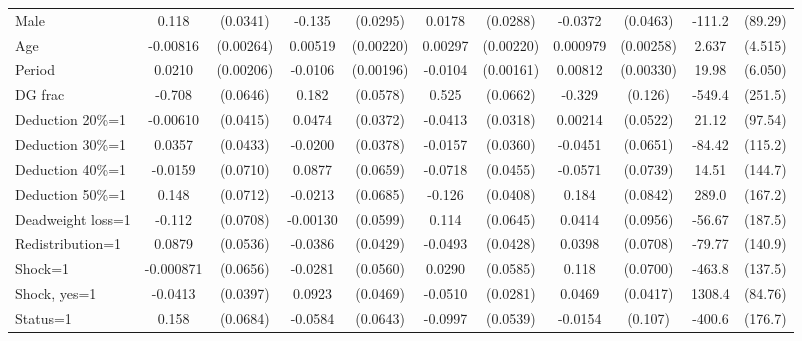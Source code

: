 \begin{tabular}{l|cccccc|cc|cc}
Male            &    0.118\sym{***}& (0.0341)&   -0.135\sym{***}& (0.0295)&   0.0178         & (0.0288)&  -0.0372         & (0.0463)&   -111.2         &  (89.29)\\
Age             & -0.00816\sym{***}&(0.00264)&  0.00519\sym{**} &(0.00220)&  0.00297         &(0.00220)& 0.000979         &(0.00258)&    2.637         &  (4.515)\\
Period          &   0.0210\sym{***}&(0.00206)&  -0.0106\sym{***}&(0.00196)&  -0.0104\sym{***}&(0.00161)&  0.00812\sym{**} &(0.00330)&    19.98\sym{***}&  (6.050)\\
DG frac         &   -0.708\sym{***}& (0.0646)&    0.182\sym{***}& (0.0578)&    0.525\sym{***}& (0.0662)&   -0.329\sym{***}&  (0.126)&   -549.4\sym{**} &  (251.5)\\
Deduction 20\%=1& -0.00610         & (0.0415)&   0.0474         & (0.0372)&  -0.0413         & (0.0318)&  0.00214         & (0.0522)&    21.12         &  (97.54)\\
Deduction 30\%=1&   0.0357         & (0.0433)&  -0.0200         & (0.0378)&  -0.0157         & (0.0360)&  -0.0451         & (0.0651)&   -84.42         &  (115.2)\\
Deduction 40\%=1&  -0.0159         & (0.0710)&   0.0877         & (0.0659)&  -0.0718         & (0.0455)&  -0.0571         & (0.0739)&    14.51         &  (144.7)\\
Deduction 50\%=1&    0.148\sym{**} & (0.0712)&  -0.0213         & (0.0685)&   -0.126\sym{***}& (0.0408)&    0.184\sym{**} & (0.0842)&    289.0\sym{*}  &  (167.2)\\
Deadweight loss=1&   -0.112         & (0.0708)& -0.00130         & (0.0599)&    0.114\sym{*}  & (0.0645)&   0.0414         & (0.0956)&   -56.67         &  (187.5)\\
Redistribution=1&   0.0879         & (0.0536)&  -0.0386         & (0.0429)&  -0.0493         & (0.0428)&   0.0398         & (0.0708)&   -79.77         &  (140.9)\\
Shock=1         &-0.000871         & (0.0656)&  -0.0281         & (0.0560)&   0.0290         & (0.0585)&    0.118\sym{*}  & (0.0700)&   -463.8\sym{***}&  (137.5)\\
Shock, yes=1    &  -0.0413         & (0.0397)&   0.0923\sym{**} & (0.0469)&  -0.0510\sym{*}  & (0.0281)&   0.0469         & (0.0417)&   1308.4\sym{***}&  (84.76)\\
Status=1        &    0.158\sym{**} & (0.0684)&  -0.0584         & (0.0643)&  -0.0997\sym{*}  & (0.0539)&  -0.0154         &  (0.107)&   -400.6\sym{**} &  (176.7)\\

\end{tabular}
